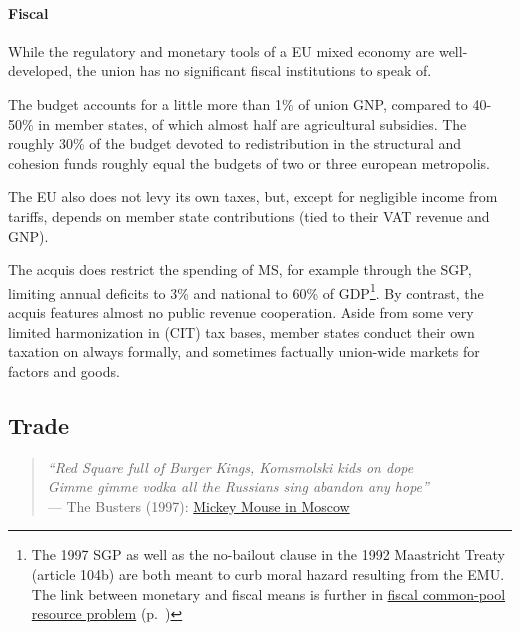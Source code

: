 \paragraph{Fiscal} While the regulatory and monetary tools of a \gls{EU} mixed economy are well-developed, the union has no significant fiscal institutions to speak of. 


The budget accounts for a little more than 1\% of union \gls{GNP}, compared to 40-50\% in member states, of which almost half are agricultural subsidies. The roughly 30\% of the budget devoted to redistribution in the structural and cohesion funds roughly equal the budgets of two or three european metropolis. %

The \gls{EU} also does not levy its own taxes, but, except for negligible income from tariffs, depends on member state contributions (tied to their \gls{VAT} revenue and \gls{GNP}). 

The acquis does restrict the spending of \gls{MS}, for example through the \gls{SGP}, limiting annual deficits to 3\% and national to 60\% of \gls{GDP}\footnote{
	The 1997 \gls{SGP} as well as the no-bailout clause in the 1992 Maastricht Treaty (article 104b) are both meant to curb moral hazard resulting from the \gls{EMU}. The link between monetary and fiscal means is further in \hyperref[sec:fiscal-CPR]{fiscal common-pool resource problem} (p.~\pageref{sec:fiscal-CPR})}.%
By contrast, the acquis features almost no public revenue cooperation. Aside from some very limited harmonization in (\gls{CIT}) tax bases, member states conduct their own taxation on always formally, and sometimes factually union-wide markets for factors and goods.

\subsection[Trade]{Trade}

\begin{verse}
	\emph{``Red Square full of Burger Kings, Komsmolski kids on dope \\ 
	Gimme gimme vodka all the Russians sing abandon any hope''\\}
	--- The Busters (1997): \href{http://www.youtube.com/watch?v=xsxRMOnpMTY}{Mickey Mouse in Moscow}\\
\end{verse}

